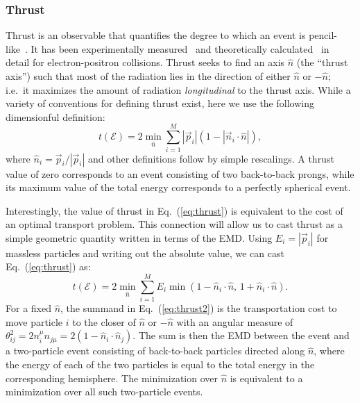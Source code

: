 \documentclass[letterpaper,11pt]{article}
\DeclareRobustCommand{\Eq}[1]{Eq.~(\ref{#1})}
\begin{document}
\subsubsection{Thrust}
\label{subsubsec:thrust}


Thrust is an observable that quantifies the degree to which an event is pencil-like~\cite{Brandt:1964sa,Farhi:1977sg,DeRujula:1978vmq}.
%
It has been experimentally measured~\cite{Barber:1979bj,Bartel:1979ut,Althoff:1983ew,Bender:1984fp,Abrams:1989ez,Li:1989sn,Decamp:1990nf,Braunschweig:1990yd,Abe:1994mf,Heister:2003aj,Abdallah:2003xz,Achard:2004sv,Abbiendi:2004qz} and theoretically calculated~\cite{Gehrmann-DeRidder:2007nzq,GehrmannDeRidder:2007hr,Becher:2008cf,Weinzierl:2009ms,Abbate:2010xh,Abbate:2012jh} in detail for electron-positron collisions.
%
Thrust seeks to find an axis $\hat n$ (the ``thrust axis'') such that most of the radiation lies in the direction of either $\hat n$ or $-\hat n$; i.e.~it maximizes the amount of radiation \emph{longitudinal} to the thrust axis.
%
While a variety of conventions for defining thrust exist, here we use the following dimensionful definition:
%
\begin{equation}\label{eq:thrust}
t(\mathcal E) = 2\min_{\hat n}\sum_{i=1}^M|\vec p_i|(1- |\vec n_i \cdot \hat n|),
\end{equation}
%
where $\hat n_i = \vec p_i/|\vec p_i|$ and other definitions follow by simple rescalings.
%
A thrust value of zero corresponds to an event consisting of two back-to-back prongs, while its maximum value of the total energy corresponds to a perfectly spherical event.


Interestingly, the value of thrust in \Eq{eq:thrust} is equivalent to the cost of an optimal transport problem.
%
This connection will allow us to cast thrust as a simple geometric quantity written in terms of the EMD.
%
Using $E_i=|\vec p_i|$ for massless particles and writing out the absolute value, we can cast \Eq{eq:thrust} as:
\begin{equation}\label{eq:thrust2}
t(\mathcal E) = 2\min_{\hat n}\sum_{i=1}^M E_i \min(1 - \hat n_i \cdot \hat n,\, 1 + \hat n_i \cdot \hat n).
\end{equation}
%
For a fixed $\hat n$, the summand in \Eq{eq:thrust2} is the transportation cost to move particle $i$ to the closer of $\hat n$ or $-\hat n$ with an angular measure of $\theta_{ij}^2 = 2n_i^\mu n_{j\mu}= 2 (1 - \hat n_i \cdot \hat n_j)$.
%
The sum is then the EMD between the event and a two-particle event consisting of back-to-back particles directed along $\hat n$, where the energy of each of the two particles is equal to the total energy in the corresponding hemisphere.
%
The minimization over $\hat n$ is equivalent to a minimization over all such two-particle events.
\end{document}
